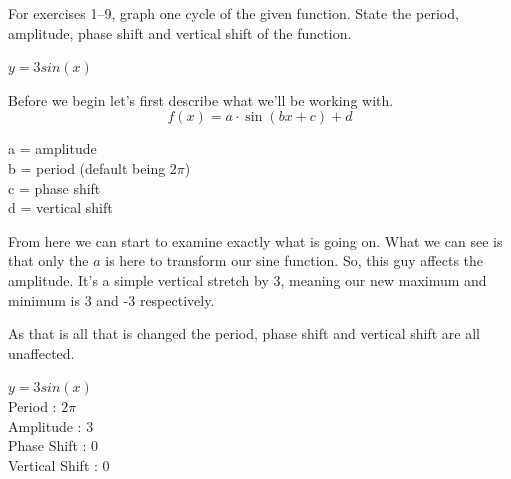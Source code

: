 \documentclass[10pt,letterpaper]{amspset}
\begin{document}

For exercises 1--9, graph one cycle of the given function. State the period, amplitude, phase shift and vertical shift of the function.

\begin{problem}[1]
    $y = 3 sin(x)$
\end{problem}

\begin{solution} 
    Before we begin let's first describe what we'll be working with. 
    \[ f(x) = a \cdot \sin(bx + c) + d \]
   
   \begin{center}
        a = amplitude \\
        b = period (default being $2\pi$)\\
        c = phase shift \\
        d = vertical shift \\
   \end{center} 
   
   From here we can start to examine exactly what is going on.  What we can see is that only the $a$ is here to transform our sine function. So, this guy affects the amplitude. It's a simple vertical stretch by 3, meaning our new maximum and minimum is 3 and -3 respectively. 
   
   As that is all that is changed the period, phase shift and vertical shift are all unaffected. 
   \medskip
   
   \noindent $y = 3 sin(x)$ \\
    Period : $2\pi$ \\
    Amplitude : 3 \\
    Phase Shift : 0 \\
    Vertical Shift : 0 \\
   
   
\end{solution}
\end{document}
